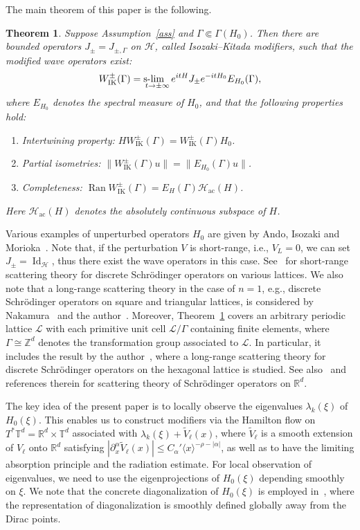 \documentclass[10pt]{amsart}
\newtheorem{theo}{Theorem}[section]
\theoremstyle{definition}\newtheorem{defi}[theo]{Definition}\newtheorem{rema}[theo]{Remark}\newtheorem{exam}[theo]{Example}\newtheorem{exem}[theo]{Example}\newtheorem{nota}[theo]{Notation}
\newcommand{\slim}{\operatorname{s-}\hspace{-0.25cm}\lim_{t\to\pm\infty}}
\newcommand{\Schr}{Schr\"odinger }
\renewcommand{\a}{\alpha}
\newcommand{\x}{\xi}
\newcommand{\R}{\mathbb{R}}
\newcommand{\Z}{\mathbb{Z}}
\newcommand{\T}{\mathbb{T}}
\newcommand{\HS}{\mathcal{H}}
\newcommand{\LS}{\mathcal{L}}
\newcommand{\ac}{\mathrm{ac}}
\newcommand{\IK}{\mathrm{IK}}
\newcommand{\la}{\langle}
\newcommand{\ra}{\rangle}
\DeclareMathOperator{\Ran}{Ran}
\DeclareMathOperator{\Idd}{Id}
\newcommand*{\relabel}{\renewcommand{\labelenumi}{(\theenumi)}}
\newcommand*{\romanenumi}{\renewcommand*{\theenumi}{\roman{enumi}}\relabel}
\begin{document}
The main theorem of this paper is the following.


\begin{theo}\label{main}
Suppose Assumption~\ref{ass} and $\Gamma \Subset \Gamma(H_0)$. Then there are bounded operators $J_\pm=J_{\pm,\Gamma}$ on $\HS$, called Isozaki--Kitada modifiers, such that the modified wave operators exist:
\begin{align}\label{modified WOs}
W_{\IK}^\pm(\Gamma)=\slim e^{itH}J_\pm e^{-itH_0}E_{H_0}(\Gamma),
\end{align}
where $E_{H_0}$ denotes the spectral measure of $H_0$, and that the following properties hold:
\begin{enumerate}\romanenumi
\item Intertwining property: $H W_{\IK}^\pm(\Gamma)=W_{\IK}^\pm(\Gamma) H_0$.
\item Partial isometries: $\|W_{\IK}^\pm(\Gamma) u\|=\|E_{H_0}(\Gamma)u\|$.
\item Completeness: $\Ran W_{\IK}^\pm(\Gamma) = E_{H}(\Gamma)\HS_{\ac}(H)$.
\end{enumerate}
\noindent Here $\HS_{\ac}(H)$ denotes the absolutely continuous subspace of $H$.
\end{theo}


Various examples of unperturbed operators $H_0$ are given by Ando, Isozaki and Morioka~\cite[Section~3]{An-I-M}. Note that, if the perturbation $V$ is short-range, i.e., $V_L=0$, we can set $J_\pm=\Idd_\HS$, thus there exist the wave operators in this case. See~\cite{P-R} for short-range scattering theory for discrete \Schr operators on various lattices. We also note that a long-range scattering theory in the case of $n=1$, e.g., discrete \Schr operators on square and triangular lattices, is considered by Nakamura~\cite{N} and the author~\cite{T1}. Moreover, Theorem~\ref{main} covers an arbitrary periodic lattice $\LS$ with each primitive unit cell $\LS/\Gamma$ containing finite elements, where $\Gamma \cong \Z^d$ denotes the transformation group associated to $\LS$. In particular, it includes the result by the author~\cite{T2}, where a long-range scattering theory for discrete \Schr operators on the hexagonal lattice is studied. See also~\cite{D-G,R-S3,Y} and references therein for scattering theory of \Schr operators on $\R^d$.



The key idea of the present paper is to locally observe the eigenvalues $\lambda_{k}(\x)$ of $H_0(\x)$. This enables us to construct modifiers via the Hamilton flow on $T^*\T^d=\R^d \times \T^d$ associated with $\lambda_k(\x)+\tilde{V}_{\ell}(x)$, where $\tilde{V}_{\ell}$ is a smooth extension of $V_\ell$ onto $\R^d$ satisfying $|\partial_x^\a \tilde V_\ell(x)|\leq C_\a' \la x \ra^{-\rho-|\a|}$, as well as to have the limiting absorption principle and the radiation estimate. For local observation of eigenvalues, we need to use the eigenprojections of $H_0(\x)$ depending smoothly on $\x$. We note that the concrete diagonalization of $H_0(\x)$ is employed in~\cite{T2}, where the representation of diagonalization is smoothly defined globally away from the Dirac points.
\end{document}

